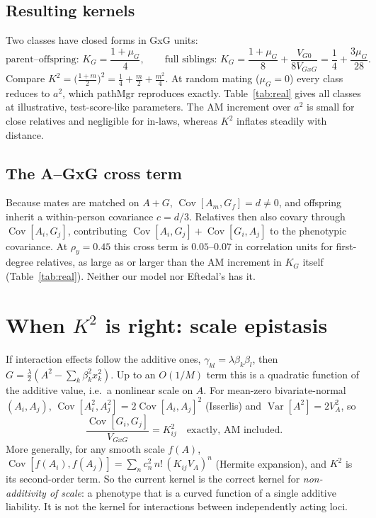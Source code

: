 \documentclass[11pt]{article}
\newcommand{\Cov}{\operatorname{Cov}}
\newcommand{\Var}{\operatorname{Var}}
\newcommand{\VA}{V_A}
\newcommand{\VG}{V_{GxG}}
\begin{document}
\subsection{Resulting kernels}
Two classes have closed forms in GxG units:
\[
\text{parent--offspring: } K_G=\frac{1+\mu_G}{4},\qquad
\text{full siblings: } K_G=\frac{1+\mu_G}{8}+\frac{V_{G0}}{8\VG}=\frac14+\frac{3\mu_G}{28}.
\]
Compare $K^2=\big(\frac{1+m}{2}\big)^2=\frac14+\frac m2+\frac{m^2}4$. At random mating ($\mu_G=0$) every class
reduces to $a^2$, which pathMgr reproduces exactly. Table~\ref{tab:real} gives all classes at illustrative,
test-score-like parameters. The AM increment over $a^2$ is small for close relatives and negligible for
in-laws, whereas $K^2$ inflates steadily with distance.

\begin{table}[h]\centering\small

\caption{GxG kernels at base $V_{A0}=0.40$, $V_{G0}=0.20$, $V_E=0.40$ (random epistasis; pathMgr path model).
$K_G$: correct kernel; $K_A^2$: the current model's kernel built from the AM-adjusted additive kernel $K_A$;
$a^2$: squared pedigree relatedness. ``cross'' is $(\Cov[A_i,G_j]+\Cov[G_i,A_j])/(2\sqrt{\VA\VG})$, the
A--GxG cross term our model omits.}\label{tab:real}
\end{table}

\subsection{The A--GxG cross term}
Because mates are matched on $A+G$, $\Cov[A_m,G_f]=d\neq0$, and offspring inherit a within-person covariance
$c=d/3$. Relatives then also covary through $\Cov[A_i,G_j]$, contributing
$\Cov[A_i,G_j]+\Cov[G_i,A_j]$ to the phenotypic covariance. At $\rho_y=0.45$ this cross term is
$0.05$--$0.07$ in correlation units for first-degree relatives, as large as or larger than the AM increment in
$K_G$ itself (Table~\ref{tab:real}). Neither our model nor Eftedal's has it.

\section{When \texorpdfstring{$K^2$}{K2} is right: scale epistasis}\label{sec:scale}
If interaction effects follow the additive ones, $\gamma_{kl}=\lambda\beta_k\beta_l$, then
$G=\tfrac\lambda2(A^2-\sum_k\beta_k^2x_k^2)$. Up to an $O(1/M)$ term this is a quadratic function of the
additive value, i.e.\ a nonlinear scale on $A$. For mean-zero bivariate-normal $(A_i,A_j)$,
$\Cov[A_i^2,A_j^2]=2\Cov[A_i,A_j]^2$ (Isserlis) and $\Var[A^2]=2\VA^2$, so
\[
\frac{\Cov[G_i,G_j]}{\VG}=K_{ij}^2\quad\text{exactly, AM included.}
\]
More generally, for any smooth scale $f(A)$, $\Cov[f(A_i),f(A_j)]=\sum_n c_n^2\,n!\,(K_{ij}\VA)^n$ (Hermite
expansion), and $K^2$ is its second-order term. So the current kernel is the correct kernel for
\emph{non-additivity of scale}: a phenotype that is a curved function of a single additive liability. It is
not the kernel for interactions between independently acting loci.
\end{document}
